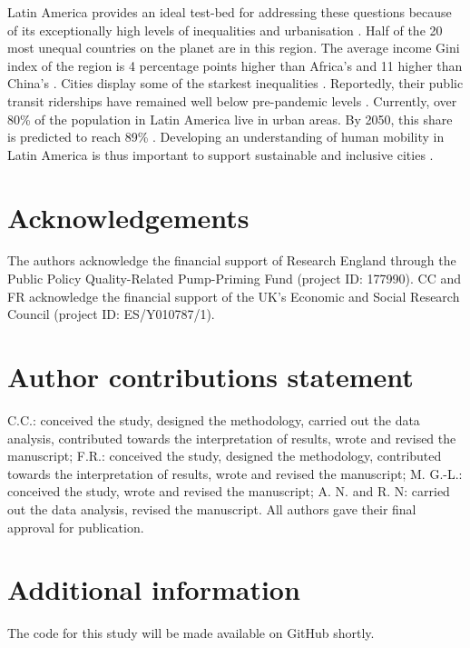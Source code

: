 \documentclass[fleqn,10pt]{wlscirep}
\begin{document}
Latin America provides an ideal test-bed for addressing these questions because of its exceptionally high levels of inequalities \cite{de2004inequality, carranza2023wealth} and urbanisation \cite{united2023world}. Half of the 20 most unequal countries on the planet are in this region. The average income Gini index of the region is 4 percentage points higher than Africa's and 11 higher than China's \cite{milanovic2016global}. Cities display some of the starkest inequalities \cite{habitat2022world}. Reportedly, their public transit riderships have remained well below pre-pandemic levels \cite{bloomberg2025transit}. Currently, over 80\% of the population in Latin America live in urban areas. By 2050, this share is predicted to reach 89\% \cite{habitat2022world}. Developing an understanding of human mobility in Latin America is thus important to support sustainable and inclusive cities \cite{habitat2022world}.



\section*{Acknowledgements}

The authors acknowledge the financial support of Research England through the Public Policy Quality-Related Pump-Priming Fund (project ID: 177990). CC and FR acknowledge the financial support of the UK's Economic and Social Research Council (project ID: ES/Y010787/1).

\section*{Author contributions statement}

C.C.: conceived the study, designed the methodology, carried out the data analysis, contributed towards the interpretation of results, wrote and revised the manuscript; F.R.: conceived the study, designed the methodology, contributed towards the interpretation of results, wrote and revised the manuscript; M. G.-L.: conceived the study, wrote and revised the manuscript; A. N. and R. N: carried out the data analysis, revised the manuscript. All authors gave their final approval for publication.

\section*{Additional information}

The code for this study will be made available on GitHub shortly.

\end{document}
